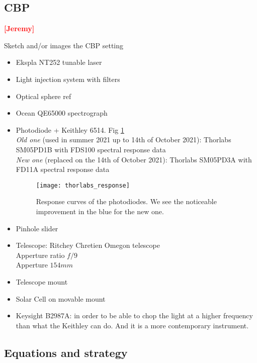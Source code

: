 \documentclass[onecolumn]{aa}
\newcommand{\todo}[1]{\textbf{\textcolor{red}{[#1]}}\xspace}
\begin{document}
\subsection{CBP}

\todo{Jeremy}

Sketch and/or images the CBP setting

\begin{itemize}
\item Ekspla NT252 tunable laser
\item Light injection system with filters
\item Optical sphere ref
\item Ocean QE65000 spectrograph
\item Photodiode + Keithley 6514. Fig \ref{fig:thorlabs_response}\\
  \emph{Old one} (used in summer 2021 up to 14th of October 2021): Thorlabs
  SM05PD1B with FDS100 spectral response data\\
  \emph{New one} (replaced on the 14th of October 2021): Thorlabs SM05PD3A with
  FD11A spectral response data
  
  \begin{figure}[!ht]
    \begin{center}
      \texttt{[image: thorlabs\_response]}
    \end{center}
    \caption[]{Response curves of the photodiodes. We see the noticeable
      improvement in the blue for the new one.}
    \label{fig:thorlabs_response}
  \end{figure}
  
  
\item Pinhole slider
\item Telescope: Ritchey Chretien Omegon telescope\\
  Apperture ratio $f/9$\\
  Apperture $154 mm$ \\  
\item Telescope mount
\item Solar Cell on movable mount
\item Keysight B2987A: in order to be able to chop the light at a higher frequency
  than what the Keithley can do. And it is a more contemporary instrument.
\end{itemize}


\subsection{Equations and strategy}
\end{document}
